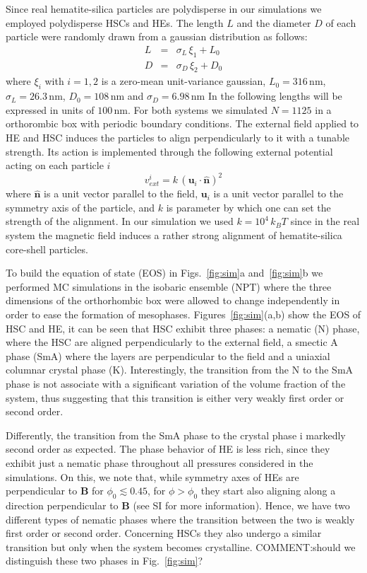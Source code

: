 \documentclass[aps,prl,preprint,superscriptaddress]{revtex4-1} %
\def\nm{\,\si{\nano\meter}}%
\begin{document}
Since real hematite-silica particles are polydisperse in our simulations we employed polydisperse HSCs and HEs.
The length $L$ and the diameter $D$ of each particle were randomly drawn from a gaussian distribution as follows:
\begin{eqnarray}
  L &=& \sigma_L\,\xi_1 + L_0\\
  D &=& \sigma_D\,\xi_2 + D_0
\end{eqnarray}
where $\xi_i$ with $i=1,2$ is a zero-mean unit-variance gaussian, $L_0=316 \nm$, $\sigma_L=26.3 \nm$, $D_0=108 \nm$ and $\sigma_D=6.98 \nm$
In the following lengths will be expressed in units of $100\nm$. 
For both systems we simulated $N=1125$ in a orthorombic box with periodic boundary conditions.
The external field applied to HE and HSC induces the particles to align perpendicularly to it with a tunable strength.
Its action is implemented through the following external potential acting on each particle $i$
\begin{equation}
v_{ext}^i = k\, {( \mathbf{u}_i\cdot \hat{\mathbf{n}} )}^2
\end{equation}
where $\hat{\mathbf{n}}$ is a unit vector parallel to the field, $\mathbf{u}_i$ is a unit vector parallel to the symmetry axis of the particle,
and $k$ is parameter by which one can set the strength of the alignment. In our simulation we used $k=10^4\, k_B T$ since in the real
system the magnetic field induces a rather strong alignment of hematite-silica core-shell particles. 

To build the equation of state (EOS) in Figs.~\ref{fig:sim}a and~\ref{fig:sim}b we performed MC simulations in the isobaric ensemble (NPT) where the three
dimensions of the orthorhombic box were allowed to change independently in order to ease the formation of mesophases.
Figures~\ref{fig:sim}(a,b) show the EOS of HSC and HE, it can be seen that HSC exhibit three phases: a nematic (N) phase, where the HSC are aligned
perpendicularly to the external field, a smectic A phase (SmA) where the layers are perpendicular to the field and a uniaxial columnar crystal phase (K).
Interestingly, the transition from the N to the SmA phase is not associate with a significant variation of the volume fraction of the system, thus
suggesting that this transition is either very weakly first order or second order. 

Differently, the transition from the SmA phase to the crystal phase
i markedly second order as expected. The phase behavior of HE is less rich, since they exhibit just a nematic phase throughout 
all pressures considered in the simulations. On this, we note that, while symmetry axes of HEs are perpendicular
to $\mathbf{B}$ for $\phi_0\lesssim 0.45$, for $\phi > \phi_0$ they start also aligning along a direction 
perpendicular to $\mathbf{B}$ (see SI for more information). Hence, we have two different types of nematic phases where the transition
between the two is weakly first order or second order. Concerning HSCs they also undergo a similar transition but only when the system 
becomes crystalline. {\color{red} COMMENT:\@ should we distinguish these two phases in Fig.~\ref{fig:sim}?}
\end{document}
